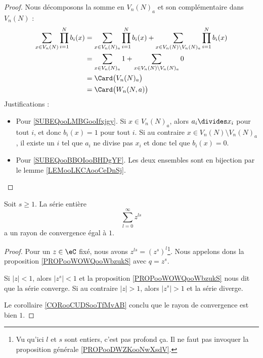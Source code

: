 \begin{proof}
    Nous décomposons la somme en \( V_n(N)_a\) et son complémentaire dans \( V_n(N)\) :
    \begin{subequations}
        \begin{align}
        \sum_{x\in V_n(N)}\prod_{i=1}^Nb_i(x)&=\sum_{x\in V_n(N)_a}\prod_{i=1}^Nb_i(x)+\sum_{x\in V_n(N)\setminus V_n(N)_a}\prod_{i=1}^Nb_i(x)\\
        &=\sum_{x\in V_n(N)_a}1+\sum_{x\in V_n(N)\setminus V_n(N)_a}0       \label{SUBEQooLMBGooIfxjgy}\\
        &=\Card\big( V_n(N)_a \big) \\
        &=\Card\big( W_n(N,a) \big)     \label{SUBEQooBBOIooBHDgYF}
        \end{align}
    \end{subequations}
    Justifications :
    \begin{itemize}
        \item Pour \eqref{SUBEQooLMBGooIfxjgy}.
    Si \( x\in V_n(N)_a\), alors \( a_i\divides x_i\) pour tout \( i\), et donc \( b_i(x)=1\) pour tout \( i\). Si au contraire \( x\in V_n(N)\setminus V_n(N)_a\), il existe un \( i\) tel que \( a_i\) ne divise pas \( x_i\) et donc tel que \( b_i(x)=0\).
\item Pour \eqref{SUBEQooBBOIooBHDgYF}. Les deux ensembles sont en bijection par le lemme \ref{LEMooLKCAooCeDnSj}.
    \end{itemize}
\end{proof}

\begin{lemma}       \label{LEMooRJOKooPJGVTr}
    Soit \( s\geq 1\). La série entière
    \begin{equation}
        \sum_{l=0}^{\infty}z^{ls}
    \end{equation}
    a un rayon de convergence égal à \( 1\).
\end{lemma}

\begin{proof}
    Pour un \( z\in \eC\) fixé, nous avons \( z^{ls}=(z^s)^l\)\footnote{Vu qu'ici \( l\) et \( s\) sont entiers, c'est pas profond ça. Il ne faut pas invoquer la proposition générale \ref{PROPooDWZKooNwXsdV}.}. Nous appelons dons la proposition \ref{PROPooWOWQooWbzukS} avec \( q=z^s\).

    Si \( | z |<1\), alors \( | z^s |<1\) et la proposition \ref{PROPooWOWQooWbzukS} nous dit que la série converge. Si au contraire \( | z |>1\), alors \( | z^s |>1\) et la série diverge.

    Le corollaire \ref{CORooCUDSooTfMvAB} conclu que le rayon de convergence est bien \( 1\).
\end{proof}


